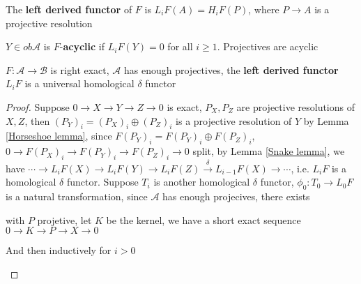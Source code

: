 \documentclass[../main.tex]{subfiles}
\begin{document}
\begin{definition}
The \textbf{left derived functor} of $F$ is $L_iF(A)=H_iF(P)$, where $P\to A$ is a projective resolution
\end{definition}

\begin{definition}
$Y\in ob\mathscr A$ is $F$-\textbf{acyclic} if $L_iF(Y)=0$ for all $i\geq1$. Projectives are acyclic
\end{definition}

\begin{theorem}
$F:\mathscr A\to\mathscr B$ is right exact, $\mathscr A$ has enough projectives, the \textbf{left derived functor} $L_iF$ is a universal homological $\delta$ functor
\end{theorem}

\begin{proof}
Suppose $0\to X\to Y\to Z\to0$ is exact, $P_X,P_Z$ are projective resolutions of $X,Z$, then $(P_Y)_i=(P_X)_i\oplus (P_Z)_i$ is a projective resolution of $Y$ by Lemma \ref{Horseshoe lemma}, since $F(P_Y)_i=F(P_Y)_i\oplus F(P_Z)_i$, $0\to F(P_X)_i\to F(P_Y)_i\to F(P_Z)_i\to0$ split, by Lemma \ref{Snake lemma}, we have $\cdots\to L_iF(X)\to L_iF(Y)\to L_iF(Z)\xrightarrow{\delta}L_{i-1}F(X)\to\cdots$, i.e. $L_iF$ is a homological $\delta$ functor. Suppose $T_i$ is another homological $\delta$ functor, $\phi_0:T_0\to L_0F$ is a natural transformation, since $\mathscr A$ has enough projecives, there exists  with $P$ projetive, let $K$ be the kernel, we have a short exact sequence $0\to K\to P\to X\to0$
\begin{center}
\end{center}
And then inductively for $i>0$
\begin{center}
\end{center}
\end{proof}
\end{document}
